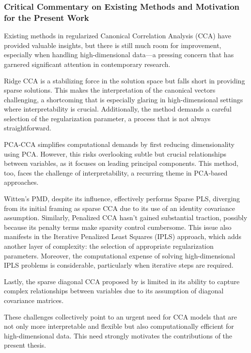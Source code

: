\subsubsection{Critical Commentary on Existing Methods and Motivation for the Present Work}

Existing methods in regularized Canonical Correlation Analysis (CCA) have provided valuable insights, but there is still much room for improvement, especially when handling high-dimensional data—a pressing concern that has garnered significant attention in contemporary research.

Ridge CCA is a stabilizing force in the solution space but falls short in providing sparse solutions. This makes the interpretation of the canonical vectors challenging, a shortcoming that is especially glaring in high-dimensional settings where interpretability is crucial. Additionally, the method demands a careful selection of the regularization parameter, a process that is not always straightforward.

PCA-CCA simplifies computational demands by first reducing dimensionality using PCA. However, this risks overlooking subtle but crucial relationships between variables, as it focuses on leading principal components. This method, too, faces the challenge of interpretability, a recurring theme in PCA-based approaches.

Witten's PMD, despite its influence, effectively performs Sparse PLS, diverging from its initial framing as sparse CCA due to its use of an identity covariance assumption. Similarly, Penalized CCA \cite{parkhomenko2009sparse} hasn't gained substantial traction, possibly because its penalty terms make sparsity control cumbersome. This issue also manifests in the Iterative Penalized Least Squares (IPLS) approach, which adds another layer of complexity: the selection of appropriate regularization parameters. Moreover, the computational expense of solving high-dimensional IPLS problems is considerable, particularly when iterative steps are required.

Lastly, the sparse diagonal CCA proposed by \cite{asteris2016simple} is limited in its ability to capture complex relationships between variables due to its assumption of diagonal covariance matrices.

These challenges collectively point to an urgent need for CCA models that are not only more interpretable and flexible but also computationally efficient for high-dimensional data. This need strongly motivates the contributions of the present thesis.


